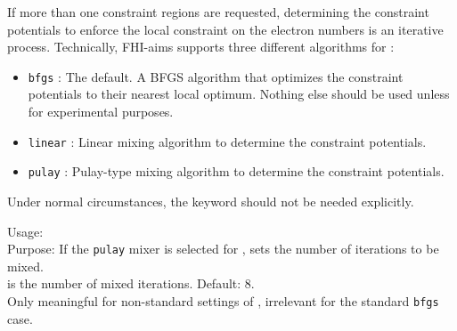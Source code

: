 If more than one constraint regions are requested, determining the
constraint potentials to enforce the local constraint on the electron
numbers is an iterative process. Technically, FHI-aims supports three
different algorithms for  :
\begin{itemize}
  \item \texttt{bfgs} : The default. A BFGS algorithm that optimizes
    the constraint potentials to their nearest local optimum. Nothing
    else should be used unless for experimental purposes. 
  \item \texttt{linear} : Linear mixing algorithm to determine the
    constraint potentials.
  \item \texttt{pulay} : Pulay-type mixing algorithm to determine the
    constraint potentials. 
\end{itemize}
Under normal circumstances, the  keyword
should not be needed explicitly.

{
  \noindent
  Usage:   \\[1.0ex]
  Purpose: If the \texttt{pulay} mixer is selected for
    , sets the number of iterations to be
    mixed. \\[1.0ex]
   is the number of mixed iterations. Default: 8. \\
}
Only meaningful for non-standard settings of
, irrelevant for the standard
\texttt{bfgs} case. 

